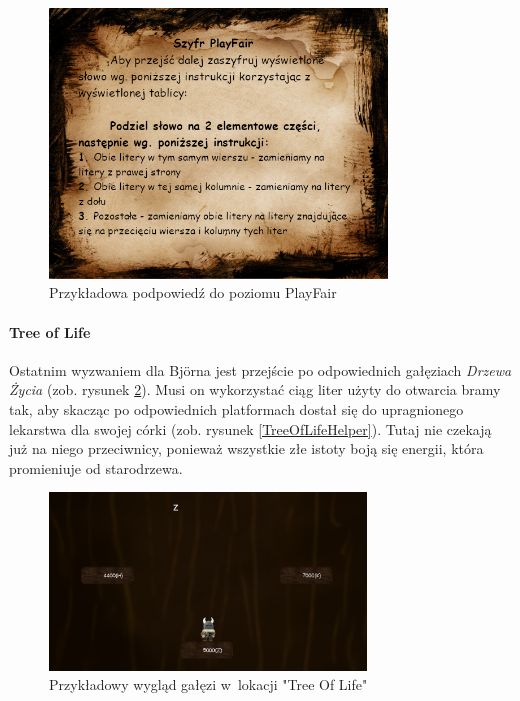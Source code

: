 \documentclass[12pt,a4paper,oneside]{book}
\theoremstyle{definition}
\numberwithin{equation}{chapter}
\begin{document}
\begin{figure}[hpt!]
        \centering
        \includegraphics[width=0.8\textwidth]{podpowiedzi/playfair_helper.png}
        \caption{Przykładowa podpowiedź do poziomu PlayFair}
        \label{PlayfairHelper}
    \end{figure}
\newpage
\paragraph{Tree of Life}\hfill \break

\par Ostatnim wyzwaniem dla Björna jest przejście po odpowiednich gałęziach \textit{Drzewa Życia} (zob. rysunek \ref{TreeOfLife}). Musi on wykorzystać ciąg liter użyty do otwarcia bramy tak, aby skacząc po odpowiednich platformach dostał się do upragnionego lekarstwa dla swojej córki (zob. rysunek \ref{TreeOfLifeHelper}). Tutaj nie czekają już na niego przeciwnicy, ponieważ wszystkie złe istoty boją się energii, która promieniuje od starodrzewa. 

\begin{figure}[hpt!]
        \centering
        \includegraphics[width=0.75\textwidth]{poziomy/binarytree.png}
        \caption{Przykładowy wygląd gałęzi w~lokacji "Tree Of Life"}
        \label{TreeOfLife}
    \end{figure}
    
\end{document}
